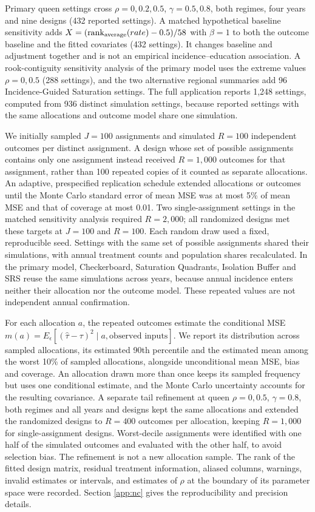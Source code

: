 \documentclass[11pt]{article}
\begin{document}
Primary queen settings cross \(\rho=0,0.2,0.5\), \(\gamma=0.5,0.8\),
both regimes, four years and nine designs (432 reported settings). A
matched hypothetical baseline sensitivity adds
\(X=(\operatorname{rank}_{\rm average}(rate)-0.5)/58\) with \(\beta=1\)
to both the outcome baseline and the fitted covariates (432 settings). It
changes baseline and adjustment together and is not an empirical
incidence--education association. A rook-contiguity sensitivity analysis of the primary model uses the extreme values $\rho=0,0.5$ (288 settings), and the two alternative regional summaries add 96 Incidence-Guided Saturation settings. The full application reports 1,248 settings, computed from 936 distinct simulation settings, because reported settings with the same allocations and outcome model share one simulation.

We initially sampled $J=100$ assignments and simulated $R=100$ independent outcomes per distinct assignment. A design whose set of possible assignments contains only one assignment instead received $R=1,000$ outcomes for that assignment, rather than 100 repeated copies of it counted as separate allocations. An adaptive, prespecified replication schedule extended allocations or outcomes until the Monte Carlo standard error of mean MSE was at most 5\% of mean MSE and that of coverage at most 0.01. Two single-assignment settings in the matched sensitivity analysis required $R=2,000$; all randomized designs met these targets at $J=100$ and $R=100$. Each random draw used a fixed, reproducible seed. Settings with the same set of possible assignments shared their simulations, with annual treatment counts and population shares recalculated. In the primary model, Checkerboard, Saturation Quadrants, Isolation Buffer and SRS reuse the same simulations across years, because annual incidence enters neither their allocation nor the outcome model. These repeated values are not independent
annual confirmation.

For each allocation $a$, the repeated outcomes estimate the conditional MSE \(m(a)=E_\epsilon[(\hat\tau-\tau)^2\mid a,\text{observed inputs}]\). We report its distribution across sampled allocations, its estimated 90th percentile and the estimated mean among the worst 10\% of sampled allocations, alongside unconditional mean MSE, bias and coverage. An allocation drawn more than once keeps its sampled frequency but uses one conditional estimate, and the Monte Carlo uncertainty accounts for the resulting covariance. A separate tail refinement at queen $\rho=0,0.5$, $\gamma=0.8$, both regimes and all years and designs kept the same allocations and extended the randomized designs to $R=400$ outcomes per allocation, keeping $R=1,000$ for single-assignment designs. Worst-decile assignments were identified with one half of the simulated outcomes and evaluated with the other half, to avoid selection bias. The refinement is not a new allocation sample. The rank of the fitted design matrix, residual treatment information, aliased columns, warnings, invalid estimates or intervals, and estimates of $\rho$ at the boundary of its parameter space were recorded. Section
\ref{app:nc} gives the reproducibility and precision details.
\end{document}
